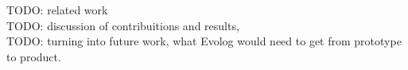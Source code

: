 TODO: related work\\
TODO: discussion of contribuitions and results,\\
TODO: turning into future work, what Evolog would need to get from prototype to product.